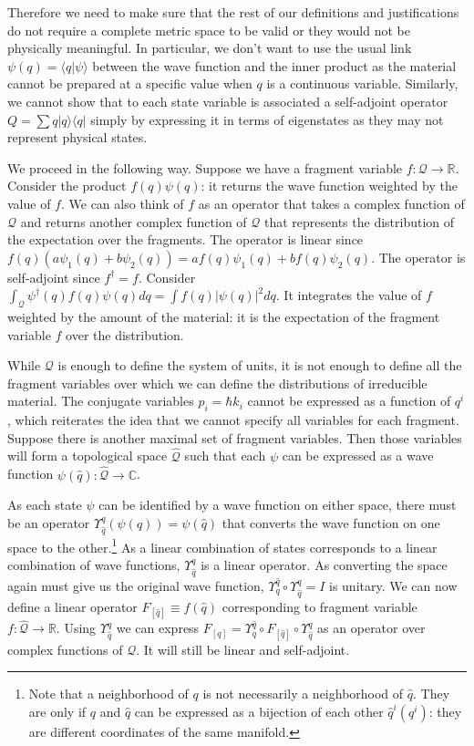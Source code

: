 \documentclass[smallextended]{svjour3}
\numberwithin{equation}{section}
\begin{document}
Therefore we need to make sure that the rest of our definitions and justifications do not require a complete metric space to be valid or they would not be physically meaningful. In particular, we don't want to use the usual link $\psi(q) = \langle q | \psi \rangle$ between the wave function and the inner product as the material cannot be prepared at a specific value when $q$ is a continuous variable. Similarly, we cannot show that to each state variable is associated a self-adjoint operator $Q = \sum q |q\rangle \langle q |$ simply by expressing it in terms of eigenstates as they may not represent physical states.

We proceed in the following way. Suppose we have a fragment variable $f : \mathcal{Q} \rightarrow \mathbb{R}$. Consider the product $f (q) \psi (q)$: it returns the wave function weighted by the value of $f$. We can also think of $f$ as an operator that takes a complex function of $\mathcal{Q}$ and returns another complex function of $\mathcal{Q}$ that represents the distribution of the expectation over the fragments. The operator is linear since $f (q) (a\psi_1(q) + b\psi_2(q)) = a f(q) \psi_1(q) + b f(q)  \psi_2(q)$. The operator is self-adjoint since $f^\dagger = f$. Consider $\int_\mathcal{Q} \psi^\dagger (q) f(q) \psi(q) dq = \int f(q) | \psi(q)|^2 dq$. It integrates the value of $f$ weighted by the amount of the material: it is the expectation of the fragment variable $f$ over the distribution. 

While $\mathcal{Q}$ is enough to define the system of units, it is not enough to define all the fragment variables over which we can define the distributions of irreducible material. The conjugate variables $p_i=\hbar k_i$ cannot be expressed as a function of $q^i$, which reiterates the idea that we cannot specify all variables for each fragment. Suppose there is another maximal set of fragment variables. Then those variables will form a topological space $\hat{\mathcal{Q}}$ such that each $\psi$ can be expressed as a wave function $\psi(\hat{q}) :\hat{\mathcal{Q}} \rightarrow \mathbb{C}$.

As each state $\psi$ can be identified by a wave function on either space, there must be an operator $\Upsilon^q_{\hat{q}}(\psi(q)) = \psi(\hat{q})$ that converts the wave function on one space to the other.\footnote{Note that a neighborhood of $q$ is not necessarily a neighborhood of $\hat{q}$. They are only if $q$ and $\hat{q}$ can be expressed as a bijection of each other $\hat{q}^i(q^i)$: they are different coordinates of the same manifold.} As a linear combination of states corresponds to a linear combination of wave functions, $\Upsilon^q_{\hat{q}}$ is a linear operator. As converting the space again must give us the original wave function, $\Upsilon^{\hat{q}}_{q} \circ \Upsilon^q_{\hat{q}}= I$ is unitary. We can now define a linear operator $F_{[\hat{q}]} \equiv f(\hat{q})$ corresponding to fragment variable $f : \hat{\mathcal{Q}} \rightarrow \mathbb{R}$. Using $\Upsilon^{q}_{\hat{q}}$ we can express $F_{[q]} = \Upsilon^{\hat{q}}_{q} \circ F_{[\hat{q}]} \circ  \Upsilon^{q}_{\hat{q}}$ as an operator over complex functions of $\mathcal{Q}$. It will still be linear and self-adjoint.
\end{document}
